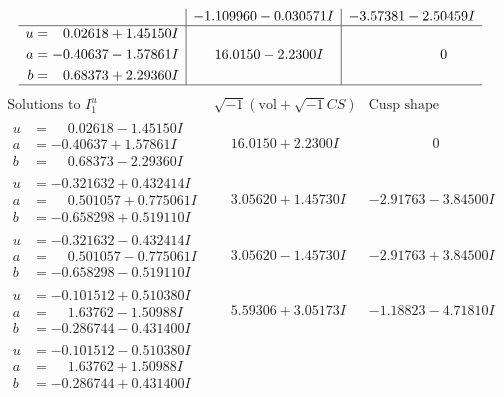 \documentclass[1p]{elsarticle_modified}
\theoremstyle{definition}
\newcommand{\I}{\sqrt{-1}}
\begin{document}
$$\begin{array}{c|c|c}
 & -1.109960 - 0.030571 I & -3.57381 - 2.50459 I \\ \hline\begin{aligned}
u &= \phantom{-}0.02618 + 1.45150 I \\
a &= -0.40637 - 1.57861 I \\
b &= \phantom{-}0.68373 + 2.29360 I\end{aligned}
 & \phantom{-}16.0150 - 2.2300 I & \phantom{-0.000000 } 0\\
 \hline 
 \end{array}$$\newpage$$\begin{array}{c|c|c}  
\text{Solutions to }I^u_{1}& \I (\text{vol} + \sqrt{-1}CS) & \text{Cusp shape}\\
 \hline 
\begin{aligned}
u &= \phantom{-}0.02618 - 1.45150 I \\
a &= -0.40637 + 1.57861 I \\
b &= \phantom{-}0.68373 - 2.29360 I\end{aligned}
 & \phantom{-}16.0150 + 2.2300 I & \phantom{-0.000000 } 0 \\ \hline\begin{aligned}
u &= -0.321632 + 0.432414 I \\
a &= \phantom{-}0.501057 + 0.775061 I \\
b &= -0.658298 + 0.519110 I\end{aligned}
 & \phantom{-}3.05620 + 1.45730 I & -2.91763 - 3.84500 I \\ \hline\begin{aligned}
u &= -0.321632 - 0.432414 I \\
a &= \phantom{-}0.501057 - 0.775061 I \\
b &= -0.658298 - 0.519110 I\end{aligned}
 & \phantom{-}3.05620 - 1.45730 I & -2.91763 + 3.84500 I \\ \hline\begin{aligned}
u &= -0.101512 + 0.510380 I \\
a &= \phantom{-}1.63762 - 1.50988 I \\
b &= -0.286744 - 0.431400 I\end{aligned}
 & \phantom{-}5.59306 + 3.05173 I & -1.18823 - 4.71810 I \\ \hline\begin{aligned}
u &= -0.101512 - 0.510380 I \\
a &= \phantom{-}1.63762 + 1.50988 I \\
b &= -0.286744 + 0.431400 I\end{aligned}

\end{array}$$
\end{document}
